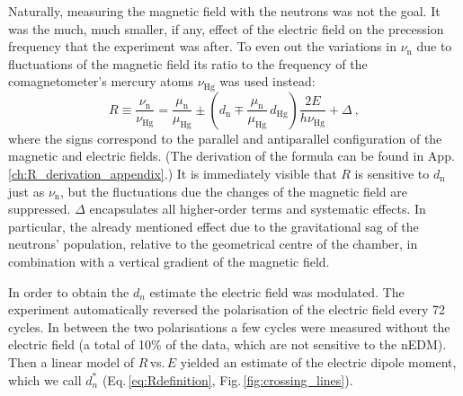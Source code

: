 Naturally, measuring the magnetic field with the neutrons was not the goal.
It was the much, much smaller, if any, effect of the electric field on the precession frequency that the experiment was after.
To even out the variations in $\nu_\text{n}$ due to fluctuations of the magnetic field its ratio to the frequency of the comagnetometer's mercury atoms $\nu_\text{Hg}$ was used instead:
\begin{equation}
  \label{eq:Rdefinition}
  R \equiv \frac{\nu_\text{n}}{\nu_\text{Hg}} = \frac{\mu_\text{n}}{\mu_\text{Hg}} \pm \left( d_\text{n} \mp \frac{\mu_\text{n}}{\mu_\text{Hg}} \, d_\text{Hg} \right) \frac{2 E}{ h  \nu_\text{Hg}} + \Delta \ ,
\end{equation}
where the signs correspond to the parallel and antiparallel configuration of the magnetic and electric fields.
(The derivation of the formula can be found in App.\,\ref{ch:R_derivation_appendix}.)
It is immediately visible that $R$ is sensitive to $d_\text{n}$ just as $\nu_\text{n}$, but the fluctuations due the changes of the magnetic field are suppressed.
$\Delta$ encapsulates all higher-order terms and systematic effects.
In particular, the already mentioned effect due to the gravitational sag of the neutrons' population, relative to the geometrical centre of the chamber, in combination with a vertical gradient of the magnetic field.

In order to obtain the $d_n$ estimate the electric field was modulated.
The experiment automatically reversed the polarisation of the electric field every 72 cycles.
In between the two polarisations a few cycles were measured without the electric field (a total of 10\% of the data, which are not sensitive to the nEDM).
Then a linear model of  $R$\,vs.\,$E$ yielded an estimate of the electric dipole moment, which we call $d_n^*$ (Eq.\,\ref{eq:Rdefinition}, Fig.\,\ref{fig:crossing_lines}).

